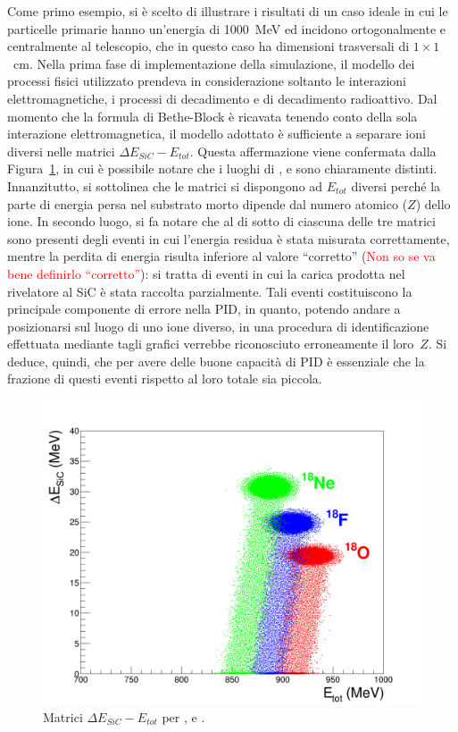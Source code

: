 Come primo esempio, si è scelto di illustrare i risultati di un caso ideale in cui le particelle primarie hanno un'energia di 1000~MeV ed incidono ortogonalmente e centralmente al telescopio, che in questo caso ha dimensioni trasversali di $1 \times 1$~cm.
Nella prima fase di implementazione della simulazione, il modello dei processi fisici utilizzato prendeva in considerazione soltanto le interazioni elettromagnetiche, i processi di decadimento e di decadimento radioattivo.
Dal momento che la formula di Bethe-Block è ricavata tenendo conto della sola interazione elettromagnetica, il modello adottato è sufficiente a separare ioni diversi nelle matrici $\Delta E_{SiC} - E_{tot}$.
Questa affermazione viene confermata dalla Figura~\ref{fig:deltaE_ETot}, in cui è possibile notare che i luoghi di ,  e  sono chiaramente distinti.
Innanzitutto, si sottolinea che le matrici si dispongono ad $E_{tot}$ diversi perché la parte di energia persa nel substrato morto dipende dal numero atomico ($Z$) dello ione.
In secondo luogo, si fa notare che al di sotto di ciascuna delle tre matrici sono presenti degli eventi in cui l'energia residua è stata misurata correttamente, mentre la perdita di energia risulta inferiore al valore ``corretto'' (\textcolor{red}{Non so se va bene definirlo ``corretto''}): si tratta di eventi in cui la carica prodotta nel rivelatore al SiC è stata raccolta parzialmente. 
Tali eventi costituiscono la principale componente di errore nella PID, in quanto, potendo andare a posizionarsi sul luogo di uno ione diverso, in una procedura di identificazione effettuata mediante tagli grafici verrebbe riconosciuto erroneamente il loro~$Z$.
Si deduce, quindi, che per avere delle buone capacità di PID è essenziale che la frazione di questi eventi rispetto al loro totale sia piccola.


\begin{figure} [!t]
	\centering
	\includegraphics[width=\textwidth, keepaspectratio]{Grafici_Tesi/Particelle_monocromatiche/deltaE_ETot_punti_grandi.png}
	\caption{Matrici $\Delta E_{SiC} - E_{tot}$ per ,  e .} \label{fig:deltaE_ETot}
\end{figure}




